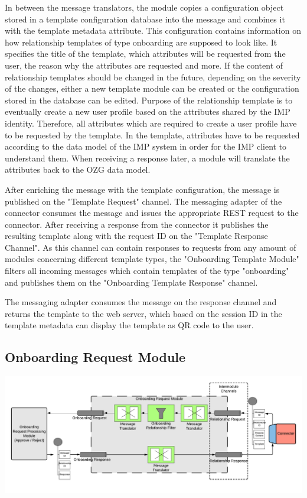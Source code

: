 In between the message translators, the module copies a configuration object stored in a template configuration database into the message and combines it with the template metadata attribute. This configuration contains information on how relationship templates of type onboarding are supposed to look like. It specifies the title of the template, which attributes will be requested from the user, the reason why the attributes are requested and more. If the content of relationship templates should be changed in the future, depending on the severity of the changes, either a new template module can be created or the configuration stored in the database can be edited. Purpose of the relationship template is to eventually create a new user profile based on the attributes shared by the IMP identity. Therefore, all attributes which are required to create a user profile have to be requested by the template. In the template, attributes have to be requested according to the data model of the IMP system in order for the IMP client to understand them. When receiving a response later, a module will translate the attributes back to the OZG data model.


After enriching the message with the template configuration, the message is published on the "Template Request" channel. The messaging adapter of the connector consumes the message and issues the appropriate REST request to the connector. After receiving a response from the connector it publishes the resulting template along with the request ID on the "Template Response Channel". As this channel can contain responses to requests from any amount of modules concerning different template types, the "Onboarding Template Module" filters all incoming messages which contain templates of the type "onboarding" and publishes them on the "Onboarding Template Response" channel.

The messaging adapter consumes the message on the response channel and returns the template to the web server, which based on the session ID in the template metadata can display the template as QR code to the user.

\subsection{Onboarding Request Module}

\begin{center}
    \includegraphics[scale=0.6]{Diagrams/Integration Architecture 1/Technological Integration/7. Onboarding Request Module.pdf}
\end{center}

